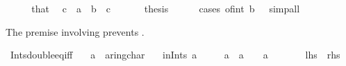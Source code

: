 \begin{isabellebody}
\ {\isacharminus}{\kern0pt}\isanewline
\ \ \isamarkupfalse%
\ that\ \isamarkupfalse%
\ c\ \ {\isachardoublequoteopen}a\ {\isacharequal}{\kern0pt}\ b\ {\isacharasterisk}{\kern0pt}\ c{\isachardoublequoteclose}\ \isacommand{{\isachardot}{\kern0pt}{\isachardot}{\kern0pt}}\isamarkupfalse%
\isanewline
\ \ \isamarkupfalse%
\ \isamarkupfalse%
\ {\isacharquery}{\kern0pt}thesis\isanewline
\ \ \ \ \isamarkupfalse%
\ {\isacharparenleft}{\kern0pt}cases\ {\isachardoublequoteopen}of{\isacharunderscore}{\kern0pt}int\ b\ {\isacharequal}{\kern0pt}\ {}{\isachardoublequoteclose}{\isacharparenright}{\kern0pt}\ simp{\isacharunderscore}{\kern0pt}all\isanewline
{}\isamarkupfalse%
%
\endisatagproof
{\isafoldproof}%
%
\isadelimproof
%
\endisadelimproof
%
\begin{isamarkuptext}%
The premise involving \isa{{\isasymint}} prevents .%
\end{isamarkuptext}\isamarkuptrue%
\isamarkupfalse%
\ Ints{\isacharunderscore}{\kern0pt}double{\isacharunderscore}{\kern0pt}eq{\isacharunderscore}{\kern0pt}{}{\isacharunderscore}{\kern0pt}iff{\isacharcolon}{\kern0pt}\isanewline
\ \ \ a\ {\isacharcolon}{\kern0pt}{\isacharcolon}{\kern0pt}\ {\isachardoublequoteopen}{\isacharprime}{\kern0pt}a{\isacharcolon}{\kern0pt}{\isacharcolon}{\kern0pt}ring{\isacharunderscore}{\kern0pt}char{\isacharunderscore}{\kern0pt}{}{\isachardoublequoteclose}\isanewline
\ \ \ in{\isacharunderscore}{\kern0pt}Ints{\isacharcolon}{\kern0pt}\ {\isachardoublequoteopen}a\ {\isasymin}\ {\isasymint}{\isachardoublequoteclose}\isanewline
\ \ \ {\isachardoublequoteopen}a\ {\isacharplus}{\kern0pt}\ a\ {\isacharequal}{\kern0pt}\ {}\ {\isasymlongleftrightarrow}\ a\ {\isacharequal}{\kern0pt}\ {}{\isachardoublequoteclose}\isanewline
\ \ \ \ {\isacharparenleft}{\kern0pt}\ {\isachardoublequoteopen}{\isacharquery}{\kern0pt}lhs\ {\isasymlongleftrightarrow}\ {\isacharquery}{\kern0pt}rhs{\isachardoublequoteclose}{\isacharparenright}{\kern0pt}\isanewline
%
\isadelimproof

\end{isabellebody}
